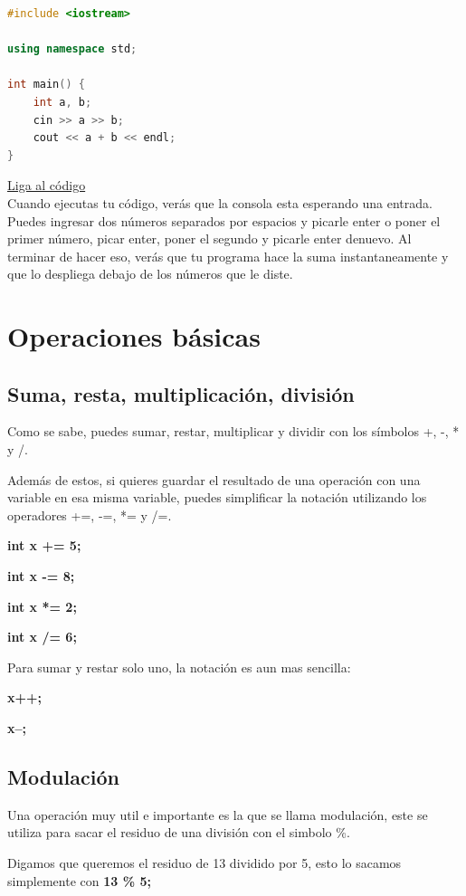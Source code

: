 \documentclass{article}
\begin{document}
\begin{lstlisting}[language=C++, caption=Suma]
#include <iostream>

using namespace std;

int main() {
    int a, b;
    cin >> a >> b;
    cout << a + b << endl;
}
\end{lstlisting}
\href{https://repl.it/@Jamesscn/Suma}{Liga al código}\\

Cuando ejecutas tu código, verás que la consola esta esperando una entrada. Puedes ingresar dos números separados por espacios y picarle enter o poner el primer número, picar enter, poner el segundo y picarle enter denuevo. Al terminar de hacer eso, verás que tu programa hace la suma instantaneamente y que lo despliega debajo de los números que le diste.

\section{Operaciones básicas}

\subsection{Suma, resta, multiplicación, división}

Como se sabe, puedes sumar, restar, multiplicar y dividir con los símbolos +, -, * y /.

Además de estos, si quieres guardar el resultado de una operación con una variable en esa misma variable, puedes simplificar la notación utilizando los operadores +=, -=, *= y /=.

\textbf{int x += 5;}

\textbf{int x -= 8;}

\textbf{int x *= 2;}

\textbf{int x /= 6;}

Para sumar y restar solo uno, la notación es aun mas sencilla:

\textbf{x++;}

\textbf{x--;}

\subsection{Modulación}

Una operación muy util e importante es la que se llama modulación, este se utiliza para sacar el residuo de una división con el simbolo \%.

Digamos que queremos el residuo de 13 dividido por 5, esto lo sacamos simplemente con \textbf{13 \% 5;}
\end{document}
